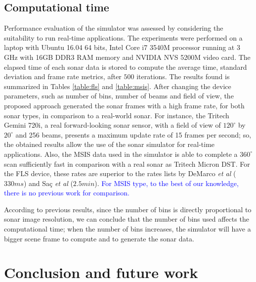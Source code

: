 \documentclass[final,5p,times]{elsarticle}
\begin{document}
\subsection{Computational time}

Performance evaluation of the simulator was assessed by considering the suitability to run real-time applications. The experiments were performed on a laptop with Ubuntu 16.04 64 bits, Intel Core i7 3540M processor running at 3 GHz with 16GB DDR3 RAM memory and NVIDIA NVS 5200M video card. The elapsed time of each sonar data is stored to compute the average time, standard deviation and frame rate metrics, after $500$ iterations. The results found is summarized in Tables \ref{table:fls} and \ref{table:msis}. After changing the device parameters, such as number of bins, number of beams and field
of view, the proposed approach generated the sonar frames with a high
frame rate, for both sonar types, in comparison to a real-world sonar. For instance, the Tritech Gemini 720i, a real forward-looking sonar sensor, with a field of view of $120^{\circ}$ by $20^{\circ}$ and 256 beams, presents a maximum update rate of 15 frames per second; so, the obtained results allow the use of the sonar simulator for real-time applications. Also, the MSIS data used in the simulator is able to complete a $360^{\circ}$ scan sufficiently fast in comparison with a
real sonar as Tritech Micron DST. For the FLS device, these rates are superior to the rates lists by DeMarco \textit{et al} \cite{demarco2015} ($330 ms$) and Saç \textit{et al} \cite{sac2015} ($2.5 min$). \textcolor{blue}{For MSIS type, to the best of our knowledge, there is no previous work for comparison.}

According to previous results, since the number of bins is directly
proportional to sonar image resolution, we can conclude that the number of bins used affects the computational time; when the number of bins increases, the simulator will have a bigger scene frame to compute and to generate the sonar data.



\section{Conclusion and future work}
\label{conclusion}
\end{document}
